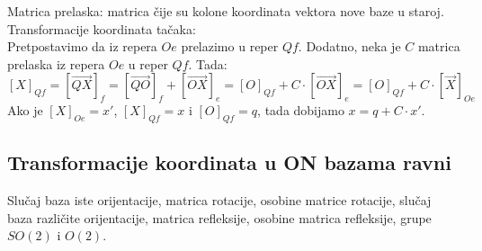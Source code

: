 \documentclass[12pt]{article}
\newcommand{\vek}[1]{\overrightarrow{#1}}
\begin{document}
    \vspace*{1cm}

    Matrica prelaska: matrica čije su kolone koordinata vektora nove baze u staroj.\\
    Transformacije koordinata tačaka:\\
    Pretpostavimo da iz repera $Oe$ prelazimo u reper $Qf$. Dodatno, neka je
$C$ matrica prelaska iz repera $Oe$ u reper $Qf$. Tada:
    $$[X]_{Qf}  =[\vek{QX}]_f =[\vek{QO}]_f+[\vek{OX}]_e =[O]_{Qf}+C\cdot[\vek{OX}]_e =[O]_{Qf}+C\cdot[\vek{X}]_{Oe}$$
    Ako je $[X]_{Oe}=x'$, $[X]_{Qf}=x$ i $[O]_{Qf}=q$, tada dobijamo $x=q+C\cdot x'$.
    \par
    \subsection{Transformacije koordinata u ON bazama ravni}
    \label{subsec:pitanje_9}
    Slučaj baza iste orijentacije, matrica rotacije, osobine matrice
    rotacije, slučaj baza različite orijentacije, matrica refleksije,
    osobine matrica refleksije, grupe $SO(2)$ i $O(2)$.\par

    \vspace*{1cm}
\end{document}
